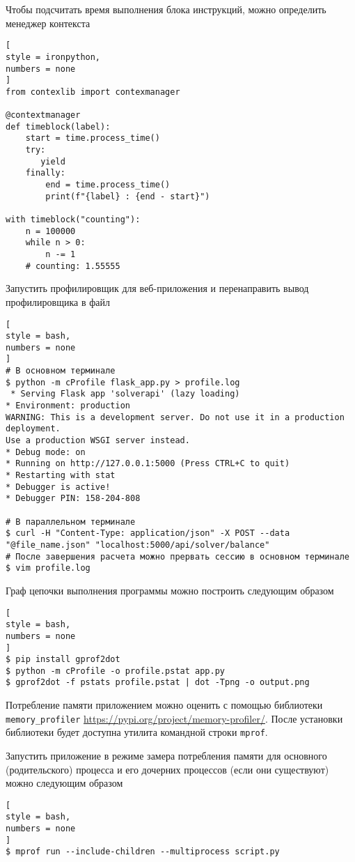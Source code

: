 \documentclass[%
	11pt,
	a4paper,
	utf8,
		]{article}
\begin{document}
Чтобы подсчитать время выполнения блока инструкций, можно определить менеджер контекста
\begin{lstlisting}[
style = ironpython,
numbers = none
]
from contexlib import contexmanager

@contextmanager
def timeblock(label):
    start = time.process_time()
    try:
       yield
    finally:
        end = time.process_time()
        print(f"{label} : {end - start}")
        
with timeblock("counting"):
	n = 100000
	while n > 0:
	    n -= 1
	# counting: 1.55555
\end{lstlisting}

Запустить профилировщик для веб-приложения и перенаправить вывод профилировщика в файл
\begin{lstlisting}[
style = bash,
numbers = none
]
# В основном терминале
$ python -m cProfile flask_app.py > profile.log
 * Serving Flask app 'solverapi' (lazy loading)
* Environment: production
WARNING: This is a development server. Do not use it in a production deployment.
Use a production WSGI server instead.
* Debug mode: on
* Running on http://127.0.0.1:5000 (Press CTRL+C to quit)
* Restarting with stat
* Debugger is active!
* Debugger PIN: 158-204-808

# В параллельном терминале
$ curl -H "Content-Type: application/json" -X POST --data "@file_name.json" "localhost:5000/api/solver/balance"
# После завершения расчета можно прервать сессию в основном терминале
$ vim profile.log
\end{lstlisting}

Граф цепочки выполнения программы можно построить следующим образом
\begin{lstlisting}[
style = bash,
numbers = none
]
$ pip install gprof2dot
$ python -m cProfile -o profile.pstat app.py
$ gprof2dot -f pstats profile.pstat | dot -Tpng -o output.png
\end{lstlisting}

Потребление памяти приложением можно оценить с помощью библиотеки \texttt{memory\_profiler} \url{https://pypi.org/project/memory-profiler/}. После установки библиотеки будет доступна утилита командной строки \texttt{mprof}.

Запустить приложение в режиме замера потребления памяти для основного (родительского) процесса и его дочерних процессов (если они существуют) можно следующим образом
\begin{lstlisting}[
style = bash,
numbers = none
]
$ mprof run --include-children --multiprocess script.py
\end{lstlisting}
\end{document}
